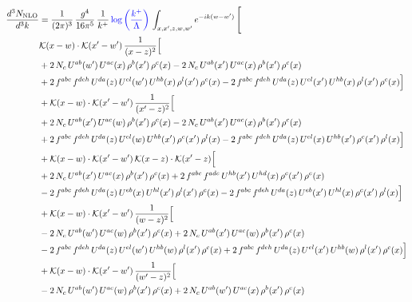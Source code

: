 \documentclass[9pt]{article}
\numberwithin{equation}{section}
\begin{document}
\begin{align}
\frac{d^{3}N_{\mathrm{NLO}}}{d^{3}k} & = \frac{1}{(2\pi)^{3}}\,\frac{g^{4}}{16\pi^{5}}\,\frac{1}{k^{+}}\,{\color{blue}\log{\left(\frac{k^{+}}{\Lambda}\right)}}\,\int_{x,x',z,w,w'}e^{-ik(w-w')}\,\Bigg[
\notag \\ & \mathcal{K}(x-w)\cdot\mathcal{K}(x'-w')\,\frac{1}{(x-z)^{2}}\Big[\notag\\
&+2\,N_{c}\,U^{ab}(w')\,U^{ac}(x)\,\rho^{b}(x')\,\rho^{c}(x) -2\,N_{c}\,U^{ab}(x')\,U^{ac}(x)\,\rho^{b}(x')\,\rho^{c}(x)\notag\\
& +2\,f^{abc}\,f^{deh}\,U^{da}(z)\,U^{el}(w')\,U^{hb}(x)\,\rho^{l}(x')\,\rho^{c}(x) -2\,f^{abc}\,f^{deh}\,U^{da}(z)\,U^{el}(x')\,U^{hb}(x)\,\rho^{l}(x')\,\rho^{c}(x)\Big]\notag\\
& +\mathcal{K}(x-w)\cdot\mathcal{K}(x'-w')\,\frac{1}{(x'-z)^{2}}\Big[\notag\\
& +2\,N_{c}\,U^{ab}(x')\,U^{ac}(w)\,\rho^{b}(x')\,\rho^{c}(x) -2\,N_{c}\,U^{ab}(x')\,U^{ac}(x)\,\rho^{b}(x')\,\rho^{c}(x)\notag\\
& +2\,f^{abc}\,f^{deh}\,U^{da}(z)\,U^{el}(w)\,U^{hb}(x')\,\rho^{c}(x')\,\rho^{l}(x) -2\,f^{abc}\,f^{deh}\,U^{da}(z)\,U^{el}(x)\,U^{hb}(x')\,\rho^{c}(x')\,\rho^{l}(x)\Big]\notag\\
& +\mathcal{K}(x-w)\cdot\mathcal{K}(x'-w')\,\mathcal{K}(x-z)\cdot\mathcal{K}(x'-z)\Big[\notag\\
& +2\,N_{c}\,U^{ab}(x')\,U^{ac}(x)\,\rho^{b}(x')\,\rho^{c}(x) +2\,f^{abc}\,f^{ade}\,U^{hb}(x')\,U^{hd}(x)\,\rho^{c}(x')\,\rho^{e}(x)\notag\\
& -2\,f^{abc}\,f^{deh}\,U^{da}(z)\,U^{eb}(x)\,U^{hl}(x')\,\rho^{l}(x')\,\rho^{c}(x) -2\,f^{abc}\,f^{deh}\,U^{da}(z)\,U^{eb}(x')\,U^{hl}(x)\,\rho^{c}(x')\,\rho^{l}(x)\Big]\notag\\
& +\mathcal{K}(x-w)\cdot\mathcal{K}(x'-w')\,\frac{1}{(w-z)^{2}}\Big[\notag\\
& -2\,N_{c}\,U^{ab}(w')\,U^{ac}(w)\,\rho^{b}(x')\,\rho^{c}(x) +2\,N_{c}\,U^{ab}(x')\,U^{ac}(w)\,\rho^{b}(x')\,\rho^{c}(x)\notag\\
& -2\,f^{abc}\,f^{deh}\,U^{da}(z)\,U^{el}(w')\,U^{hb}(w)\,\rho^{l}(x')\,\rho^{c}(x) +2\,f^{abc}\,f^{deh}\,U^{da}(z)\,U^{el}(x')\,U^{hb}(w)\,\rho^{l}(x')\,\rho^{c}(x)\Big]\notag\\
& +\mathcal{K}(x-w)\cdot\mathcal{K}(x'-w')\,\frac{1}{(w'-z)^{2}}\Big[\notag\\
& -2\,N_{c}\,U^{ab}(w')\,U^{ac}(w)\,\rho^{b}(x')\,\rho^{c}(x) +2\,N_{c}\,U^{ab}(w')\,U^{ac}(x)\,\rho^{b}(x')\,\rho^{c}(x)\notag\\

\end{align}
\end{document}
